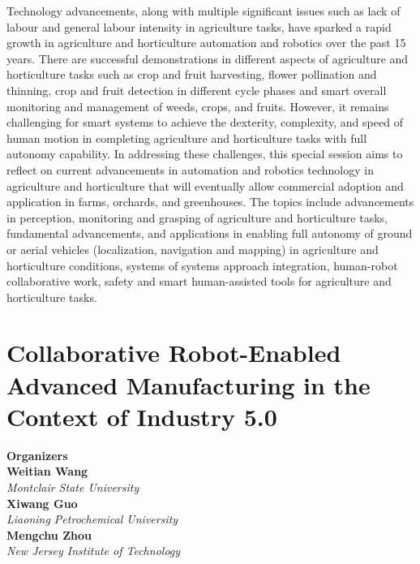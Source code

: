 Technology advancements, along with multiple significant issues such as lack of labour and general labour intensity in agriculture tasks, have sparked a rapid growth in agriculture and horticulture automation and robotics over the past 15 years. There are successful demonstrations in different aspects of agriculture and horticulture tasks such as crop and fruit harvesting, flower pollination and thinning, crop and fruit detection in different cycle phases and smart overall monitoring and management of weeds, crops, and fruits. However, it remains challenging for smart systems to achieve the dexterity, complexity, and speed of human motion in completing agriculture and horticulture tasks with full autonomy capability. In addressing these challenges, this special session aims to reflect on current advancements in automation and robotics technology in agriculture and horticulture that will eventually allow commercial adoption and application in farms, orchards, and greenhouses. The topics include advancements in perception, monitoring and grasping of agriculture and horticulture tasks, fundamental advancements, and applications in enabling full autonomy of ground or aerial vehicles (localization, navigation and mapping) in agriculture and horticulture conditions, systems of systems approach integration, human-robot collaborative work, safety and smart human-assisted tools for agriculture and horticulture tasks. 

\section{Collaborative Robot-Enabled Advanced Manufacturing in the Context of Industry 5.0}


\large \textbf{Organizers} \normalsize \vspace{2mm} \\
\textbf{Weitian  Wang} \\ 
\textit{Montclair State University} \vspace{{2mm}} \\
\textbf{Xiwang  Guo} \\ 
\textit{Liaoning Petrochemical University} \vspace{{2mm}} \\
\textbf{Mengchu  Zhou} \\ 
\textit{New Jersey Institute of Technology}

